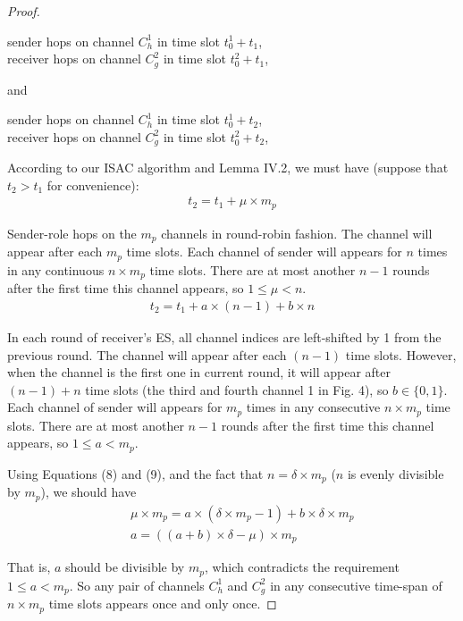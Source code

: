 \documentclass[journal]{IEEEtran}
\begin{document}
\begin{proof}
\begin{center}
sender hops on channel $C_h^1$ in time slot $t_0^1+t_1$,\\
receiver hops on channel $C_g^2$ in time slot $t_0^2+t_1$,
\end{center}
and
\begin{center}
sender hops on channel $C_h^1$ in time slot $t_0^1+t_2$,\\
receiver hops on channel $C_g^2$ in time slot $t_0^2+t_2$,
\end{center}
\par According to our ISAC algorithm and Lemma IV.2, we must have (suppose that $t_2>t_1$ for convenience):
\begin{eqnarray}
t_2=t_1+\mu\times m_p
\end{eqnarray}
\par Sender-role hops on the $m_p$ channels in round-robin fashion. The channel will appear after each $m_p$ time slots. Each channel of sender will appears for $n$ times in any continuous $n\times m_p$ time slots. There are at most another $n-1$ rounds after the first time this channel appears, so $1\leq\mu<n$.
\begin{eqnarray}
t_2=t_1+a\times(n-1)+b\times n
\end{eqnarray}
\par In each round of receiver's ES, all channel indices are left-shifted by 1 from the previous round. The channel will appear after each $(n-1)$ time slots. However, when the channel is the first one in current round, it will appear after $(n-1)+n$ time slots (the third and fourth channel 1 in Fig. 4), so $b\in\{0,1\}$.  Each channel of sender will appears for $m_p$ times in any consecutive $n\times m_p$ time slots. There are at most another $n-1$ rounds after the first time this channel appears, so $1\leq a<m_p$.
\par Using Equations (8) and (9), and the fact that $n=\delta\times m_p$ ($n$ is evenly divisible by $m_p$), we should have
\begin{eqnarray}
&&\mu\times m_p=a\times (\delta\times m_p-1)+b\times\delta\times m_p\\
&&a=((a+b)\times\delta-\mu)\times m_p
\end{eqnarray}
\par That is, $a$ should be divisible by $m_p$, which contradicts the requirement $1\leq a<m_p$. So any pair of channels $C_h^1$ and $C_g^2$ in any consecutive time-span of $n\times m_p$ time slots appears once and only once.

\end{proof}
\end{document}
